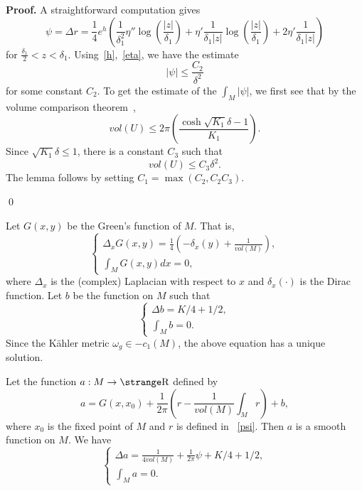 {\bf Proof.}
A straightforward computation gives
\begin{equation}\label{psi}
\psi=\Delta r=\frac 14 e^h(\frac{1}{\delta_1^2}\eta''\log(
\frac{|z|}{\delta_1})+\eta'\frac{1}{\delta_1|z|}\log(
\frac{|z|}{\delta_1})+2\eta'\frac{1}{\delta_1|z|})
\end{equation}
for $\frac{\delta_1}{2}<z<\delta_1$. Using~\eqref{h},~\eqref{eta},
we have the estimate
\[
|\psi|\leq \frac{C_2}{\delta^2}
\]
for some constant $C_2$.
To get the estimate of the $\int_M|\psi|$, we first see that by the 
volume comparison theorem~\cite[page 11]{SY}, 
\[
vol(U)\leq2\pi(\frac{\cosh \sqrt{K_1}\delta-1}{K_1}).
\]
Since $\sqrt{K_1}\delta\leq 1$, there is a constant $C_3$
such that
\begin{equation}\label{vol}
vol(U)\leq C_3\delta^2.
\end{equation}
The lemma follows by setting $C_1=\max(C_2, C_2C_3)$.

\qed

Let $G(x,y)$ be the Green's function of $M$. That is,
\[
\left\{
\begin{array}{l}
\Delta_x G(x,y)=\frac 14({-\delta_x(y)+\frac{1}{vol(M)}}),\\
\int_M G(x,y) dx=0,
\end{array}
\right.
\]
where $\Delta_x$ is the (complex) Laplacian with respect to $x$
and $\delta_x(\cdot)$ is the Dirac function.
Let $b$ be the function on $M$ such that
\[
\left\{
\begin{array}{l}
\Delta b=K/4+1/2,\\
\int_M b=0.
\end{array}
\right.
\]
Since the K\"ahler metric $\omega_g\in -c_1(M)$, the above 
equation
 has a
unique solution.


Let the function $a: M\rightarrow\R$ defined by
\begin{equation}\label{xxa}
a=G(x,x_0)+\frac{1}{2\pi}(r-\frac{1}{vol(M)}\int_Mr)+b,
\end{equation}
where $x_0$ is the fixed point of $M$ and $r$ is defined in
~\eqref{psi}. Then $a$ is a smooth function on $M$.
We have
\begin{equation}\label{defa}
\left\{
\begin{array}{l}
\Delta a=\frac{1}{4vol(M)}+\frac{1}{2\pi}\psi+K/4+1/2,\\
\int_M a=0.
\end{array}
\right.
\end{equation}





